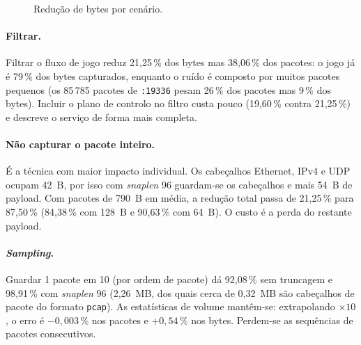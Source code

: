 \documentclass[a4paper,11pt]{article}
\begin{document}
\begin{figure}[htbp]
\centering
{}
\caption{Redução de bytes por cenário.}\label{fig:red}
\end{figure}

\paragraph{Filtrar.} Filtrar o fluxo de jogo reduz 21,25\,\% dos bytes mas 38,06\,\% dos pacotes: o jogo já é 79\,\%
dos bytes capturados, enquanto o ruído é composto por muitos pacotes pequenos (os 85\,785 pacotes de \texttt{:19336}
pesam 26\,\% dos pacotes mas 9\,\% dos bytes). Incluir o plano de controlo no filtro custa pouco
(19,60\,\% contra 21,25\,\%) e descreve o serviço de forma mais completa.

\paragraph{Não capturar o pacote inteiro.} É a técnica com maior impacto individual. Os cabeçalhos Ethernet, IPv4 e UDP
ocupam 42~B, por isso com \emph{snaplen} 96 guardam-se os cabeçalhos e mais 54~B de payload. Com pacotes de
790~B em média, a redução total passa de 21,25\,\% para 87,50\,\% (84,38\,\% com 128~B e 90,63\,\% com 64~B).
O custo é a perda do restante payload.

\paragraph{\emph{Sampling}.} Guardar 1 pacote em 10 (por ordem de pacote) dá 92,08\,\% sem truncagem e 98,91\,\% com
\emph{snaplen} 96 (2,26~MB, dos quais cerca de 0,32~MB são cabeçalhos de pacote do formato \texttt{pcap}). As estatísticas
de volume mantêm-se: extrapolando $\times 10$, o erro é $-0{,}003\,\%$ nos pacotes e $+0{,}54\,\%$ nos bytes.
Perdem-se as sequências de pacotes consecutivos.
\end{document}
